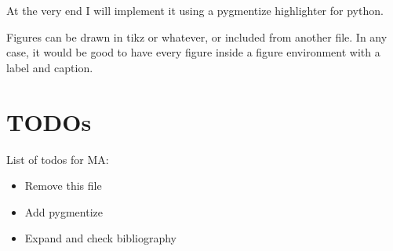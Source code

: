 At the very end I will implement it using a pygmentize highlighter for python.

Figures can be drawn in tikz or whatever, or included from another file. In any case, it would be good to have every figure inside a figure environment with a label and caption.

\section{TODOs}
List of todos for MA:
\begin{itemize}
\item Remove this file
\item Add pygmentize
\item Expand and check bibliography
\end{itemize}